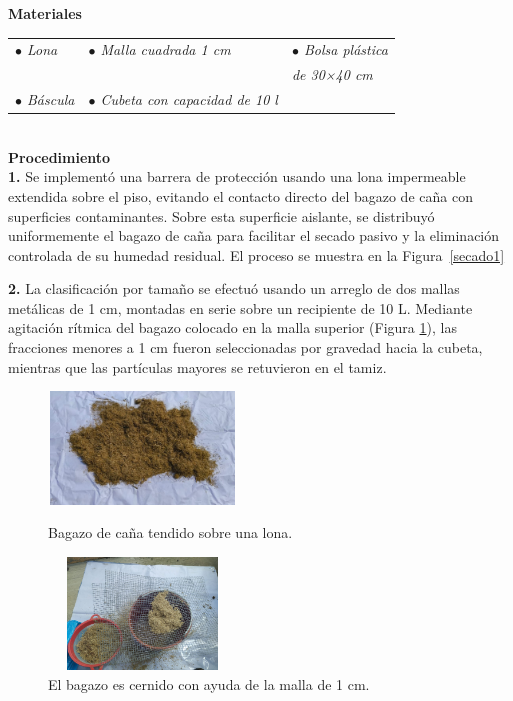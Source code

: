 \documentclass[12pt]{article}
\begin{document}
			
			\textbf{Materiales} \\[0.5em]
			
			
			\begin{tabular}{p{0.3\textwidth}p{}p{}}
			\textit{	$\bullet$ Lona} &  \textit{$\bullet$  Malla cuadrada 1 cm} & \textit{$\bullet$ Bolsa plástica  }\\
				&&\textit{de 30×40 cm} \\
				\textit{$\bullet$ Báscula} & \textit{$\bullet$ Cubeta con capacidad de 10 l} & 
			\end{tabular}
		\\[0.5em]
			
			
			\textbf{Procedimiento}
			\\[0.5em]
			\textbf{1.} Se implementó una barrera de protección usando una lona impermeable extendida sobre el piso, evitando el contacto directo del bagazo de caña con superficies contaminantes. Sobre esta superficie aislante, se distribuyó uniformemente el bagazo de caña para facilitar el secado pasivo y la eliminación controlada de su humedad residual. El proceso se muestra en la Figura~\ref{secado1}

			
			\textbf{2.}	La clasificación por tamaño se efectuó usando un arreglo de dos mallas metálicas de 1 cm, montadas en serie sobre un recipiente de 10 L. Mediante agitación rítmica del bagazo colocado en la malla superior (Figura \ref{cernir_bagazo_B}), las fracciones menores a 1 cm fueron seleccionadas por gravedad hacia la cubeta, mientras que las partículas mayores se retuvieron en el tamiz.
		
			
				\begin{figure}[H]
				\centering
				\begin{minipage}{0.46\textwidth}
					\centering
					\includegraphics[width=5cm, height=3cm]{imagenes/secado de bagazo} %
					\caption{Bagazo de caña tendido sobre una lona.}
					\label{secado1}
				\end{minipage}
				\hfill
				\begin{minipage}{0.48\textwidth}
					\centering
					\includegraphics[width=5cm, height=3cm]{imagenes/cernir_bagazo_1} %
					\caption{El bagazo es cernido con ayuda de la malla de 1 cm.}
					\label{cernir_bagazo_B}
				\end{minipage}
			\end{figure}
			
\end{document}
